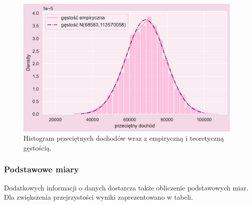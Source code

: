 \documentclass{article}
\begin{document}
    \begin{figure}[H]
	\begin{center}
		\includegraphics[scale=0.68]{images/income_hist_teor.pdf}
		\caption{Histogram przeciętnych dochodów wraz z empiryczną i teoretyczną gęstością.}
		\label{denistyx}
	\end{center}
	\end{figure}
 
\subsubsection{Podstawowe miary}
Dodatkowych informacji o danych dostarcza także obliczenie podstawowych miar. Dla zwiększenia przejrzystości wyniki zaprezentowano w tabeli. 
\end{document}
